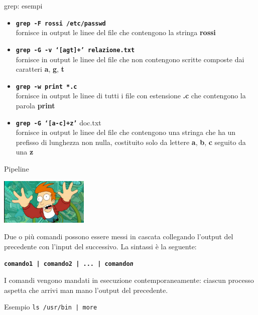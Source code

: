 \documentclass{beamer}
\begin{document}
    \begin{frame}{grep: esempi}
        \small
        \begin{itemize}
            \item \texttt{\textbf{grep -F rossi /etc/passwd}} \\ fornisce in output le linee del file che contengono la stringa \textbf{rossi}
            \item \texttt{\textbf{grep -G -v `[agt]+' relazione.txt}} \\ fornisce in output le linee del file che non contengono scritte composte dai caratteri \textbf{a}, \textbf{g}, \textbf{t}
            \item \texttt{\textbf{grep -w print *.c}} \\ fornisce in output le linee di tutti i file con estensione \textbf{.c} che contengono la parola \textbf{print}
            \item \texttt{\textbf{grep -G `[a-c]+z'}} doc.txt \\ fornisce in output le linee del file che contengono una stringa che ha un prefisso di lunghezza non nulla, costituito solo da lettere \textbf{a}, \textbf{b}, \textbf{c} seguito da una \textbf{z}
        \end{itemize}
    \end{frame}

    \begin{frame}{Pipeline}
        \begin{center}
            \includegraphics[height=2.2cm,keepaspectratio]{images/futurama.png}
        \end{center}
        Due o più comandi possono essere messi in cascata collegando l'output
        del precedente con l'input del successivo. La sintassi è la seguente: 
        
        \begin{center}
            \texttt{\textbf{comando1 | comando2 | ... | comando\textit{n}}}
        \end{center}

        I comandi vengono mandati in esecuzione contemporaneamente: ciascun processo aspetta che arrivi man mano l’output del precedente.

        \begin{exampleblock}{Esempio}
            \texttt{ls /usr/bin | more }
        \end{exampleblock}
    \end{frame}
\end{document}
